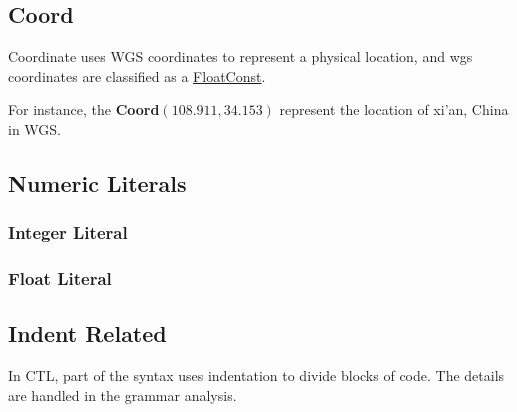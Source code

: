 \begin{grammar}
\end{grammar}

\subsection{Coord} \label{Coord}
Coordinate uses WGS coordinates to represent a physical location, and wgs coordinates are classified as a \hyperref[FloatConst]{FloatConst}.
\begin{grammar}
\end{grammar}
For instance, the \textbf{Coord}$(108.911, 34.153)$ represent the location of  xi'an, China in WGS.

\subsection{Numeric Literals}\label{FloatConst}\label{IntConst}
\subsubsection{Integer Literal}
\begin{grammar}
     \label{DecimalLiteral}
    \label{HexLiteral}
    \label{OctLiteral}
\end{grammar}
\subsubsection{Float Literal}
\begin{grammar}
         \label{FloatLiteral}
     \label{HexFloatLiteral}
\end{grammar}


\subsection{Indent Related}\label{NEWLINE}\label{INDENT}\label{DEDENT}
In CTL, part of the syntax uses indentation to divide blocks of code. The details are handled in the grammar analysis.


